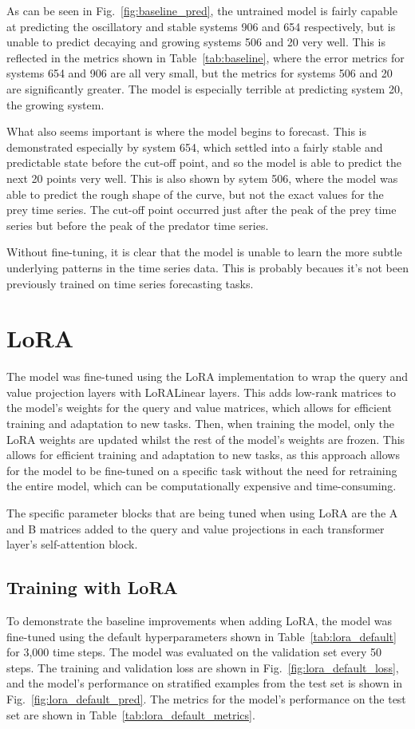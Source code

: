 \documentclass[11pt,a4paper]{article}
\begin{document}
As can be seen in Fig.~\ref{fig:baseline_pred}, the untrained model is fairly capable at predicting the oscillatory and stable systems 906 and 654 respectively, but is unable to predict decaying and growing systems 506 and 20 very well. This is reflected in the metrics shown in Table~\ref{tab:baseline}, where the error metrics for systems 654 and 906 are all very small, but the metrics for systems 506 and 20 are significantly greater. The model is especially terrible at predicting system 20, the growing system. 

What also seems important is where the model begins to forecast. This is demonstrated especially by system 654, which settled into a fairly stable and predictable state before the cut-off point, and so the model is able to predict the next 20 points very well. This is also shown by sytem 506, where the model was able to predict the rough shape of the curve, but not the exact values for the prey time series. The cut-off point occurred just after the peak of the prey time series but before the peak of the predator time series.

Without fine-tuning, it is clear that the model is unable to learn the more subtle underlying patterns in the time series data. This is probably becaues it's not been previously trained on time series forecasting tasks.
\clearpage
\section{LoRA}
\label{sec:lora}

The model was fine-tuned using the LoRA \citep{hu2021loralowrankadaptationlarge} implementation to wrap the query and value projection layers with LoRALinear layers. This adds low-rank matrices to the model's weights for the query and value matrices, which allows for efficient training and adaptation to new tasks. Then, when training the model, only the LoRA weights are updated whilst the rest of the model's weights are frozen. This allows for efficient training and adaptation to new tasks, as this approach allows for the model to be fine-tuned on a specific task without the need for retraining the entire model, which can be computationally expensive and time-consuming.

The specific parameter blocks that are being tuned when using LoRA are the A and B matrices added to the query and value projections in each transformer layer's self-attention block.

\subsection{Training with LoRA}
To demonstrate the baseline improvements when adding LoRA, the model was fine-tuned using the default hyperparameters shown in Table~\ref{tab:lora_default} for 3,000 time steps. The model was evaluated on the validation set every 50 steps. The training and validation loss are shown in Fig.~\ref{fig:lora_default_loss}, and the model's performance on stratified examples from the test set is shown in Fig.~\ref{fig:lora_default_pred}. The metrics for the model's performance on the test set are shown in Table~\ref{tab:lora_default_metrics}.
\end{document}

